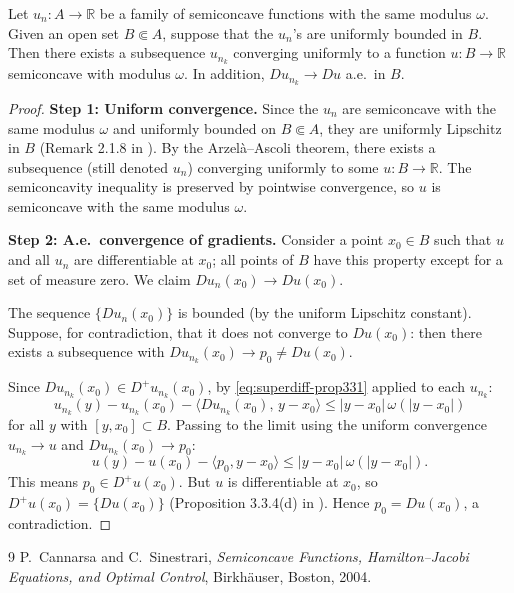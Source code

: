 \begin{theorem}\label{thm:sc-compactness}
Let $u_n : A \to \mathbb{R}$ be a family of semiconcave functions with the same modulus $\omega$. Given an open set $B \Subset A$, suppose that the $u_n$'s are uniformly bounded in $B$. Then there exists a subsequence $u_{n_k}$ converging uniformly to a function $u : B \to \mathbb{R}$ semiconcave with modulus $\omega$. In addition, $Du_{n_k} \to Du$ a.e.\ in $B$.
\end{theorem}

\begin{proof}
\textbf{Step 1: Uniform convergence.}
Since the $u_n$ are semiconcave with the same modulus $\omega$ and uniformly bounded on $B \Subset A$, they are uniformly Lipschitz in $B$ (Remark 2.1.8 in \cite{cannarsa2004semiconcave}). By the Arzel\`a--Ascoli theorem, there exists a subsequence (still denoted $u_n$) converging uniformly to some $u : B \to \mathbb{R}$. The semiconcavity inequality is preserved by pointwise convergence, so $u$ is semiconcave with the same modulus $\omega$.

\medskip\noindent\textbf{Step 2: A.e.\ convergence of gradients.}
Consider a point $x_0 \in B$ such that $u$ and all $u_n$ are differentiable at $x_0$; all points of $B$ have this property except for a set of measure zero. We claim $Du_n(x_0) \to Du(x_0)$.

The sequence $\{Du_n(x_0)\}$ is bounded (by the uniform Lipschitz constant). Suppose, for contradiction, that it does not converge to $Du(x_0)$: then there exists a subsequence with $Du_{n_k}(x_0) \to p_0 \neq Du(x_0)$.

Since $Du_{n_k}(x_0) \in D^+ u_{n_k}(x_0)$, by \eqref{eq:superdiff-prop331} applied to each $u_{n_k}$:
\[
	u_{n_k}(y) - u_{n_k}(x_0) - \langle Du_{n_k}(x_0),\, y - x_0 \rangle \leqslant |y - x_0|\,\omega(|y - x_0|)
\]
for all $y$ with $[y, x_0] \subset B$. Passing to the limit using the uniform convergence $u_{n_k} \to u$ and $Du_{n_k}(x_0) \to p_0$:
\[
	u(y) - u(x_0) - \langle p_0, y - x_0 \rangle \leqslant |y - x_0|\,\omega(|y - x_0|).
\]
This means $p_0 \in D^+ u(x_0)$. But $u$ is differentiable at $x_0$, so $D^+ u(x_0) = \{Du(x_0)\}$ (Proposition 3.3.4(d) in \cite{cannarsa2004semiconcave}). Hence $p_0 = Du(x_0)$, a contradiction.
\end{proof}

\begin{thebibliography}{9}
P.~Cannarsa and C.~Sinestrari, \emph{Semiconcave Functions, Hamilton--Jacobi Equations, and Optimal Control}, Birkh\"auser, Boston, 2004.
\end{thebibliography}


